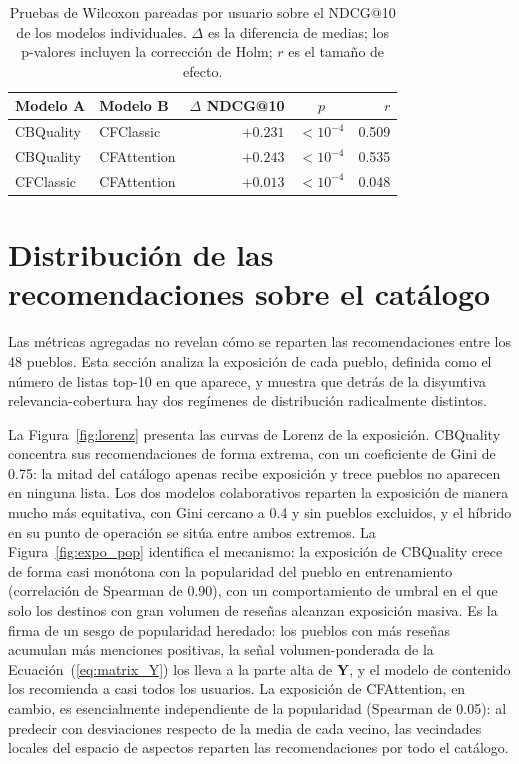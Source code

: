 \begin{table}[ht]
	\centering
	\caption{Pruebas de Wilcoxon pareadas por usuario sobre el NDCG@10 de los modelos
		individuales. $\Delta$ es la diferencia de medias; los p-valores incluyen la
		corrección de Holm; $r$ es el tamaño de efecto.}
	\label{tab:significancia}
	\begin{tabular}{llrcr}
		\toprule
		\textbf{Modelo A} & \textbf{Modelo B} & \textbf{$\Delta$ NDCG@10} & \textbf{$p$} & \textbf{$r$} \\
		\midrule
		CBQuality & CFClassic   & $+0.231$ & $<10^{-4}$ & 0.509 \\
		CBQuality & CFAttention & $+0.243$ & $<10^{-4}$ & 0.535 \\
		CFClassic & CFAttention & $+0.013$ & $<10^{-4}$ & 0.048 \\
		\bottomrule
	\end{tabular}
\end{table}

\section{Distribución de las recomendaciones sobre el catálogo}\label{sec:res_distribucion}

Las métricas agregadas no revelan cómo se reparten las recomendaciones entre los 48
pueblos. Esta sección analiza la exposición de cada pueblo, definida como el número de
listas top-10 en que aparece, y muestra que detrás de la disyuntiva relevancia-cobertura
hay dos regímenes de distribución radicalmente distintos.

La Figura~\ref{fig:lorenz} presenta las curvas de Lorenz de la exposición. CBQuality
concentra sus recomendaciones de forma extrema, con un coeficiente de Gini de 0.75: la
mitad del catálogo apenas recibe exposición y trece pueblos no aparecen en ninguna lista.
Los dos modelos colaborativos reparten la exposición de manera mucho más equitativa, con
Gini cercano a 0.4 y sin pueblos excluidos, y el híbrido en su punto de operación se sitúa
entre ambos extremos. La Figura~\ref{fig:expo_pop} identifica el mecanismo: la exposición
de CBQuality crece de forma casi monótona con la popularidad del pueblo en entrenamiento
(correlación de Spearman de 0.90), con un comportamiento de umbral en el que solo los
destinos con gran volumen de reseñas alcanzan exposición masiva. Es la firma de un sesgo
de popularidad heredado: los pueblos con más reseñas acumulan más menciones positivas, la
señal volumen-ponderada de la Ecuación~(\ref{eq:matrix_Y}) los lleva a la parte alta de
$\mathbf{Y}$, y el modelo de contenido los recomienda a casi todos los usuarios. La
exposición de CFAttention, en cambio, es esencialmente independiente de la popularidad
(Spearman de 0.05): al predecir con desviaciones respecto de la media de cada vecino, las
vecindades locales del espacio de aspectos reparten las recomendaciones por todo el
catálogo.


